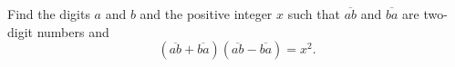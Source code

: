 Find the digits $a$ and $b$ and the positive integer $x$ such that $\overline{ab}$ and $\overline{ba}$ are two-digit numbers and
\[
\left(\overline{ab}+\overline{ba}\right)\left(\overline{ab}-\overline{ba}\right)=x^2 .
\]
